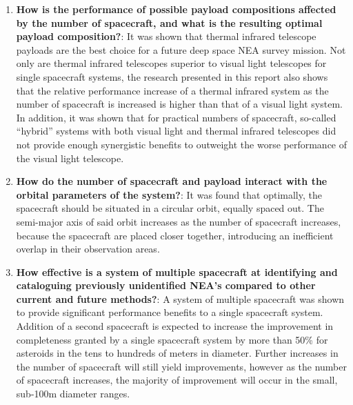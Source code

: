\begin{enumerate}
 \item \textbf{How is the performance of possible payload compositions affected by the number of spacecraft, and what is the resulting optimal payload composition?}: It was shown that thermal infrared telescope payloads are the best choice for a future deep space NEA survey mission. Not only are thermal infrared telescopes superior to visual light telescopes for single spacecraft systems, the research presented in this report also shows that the relative performance increase of a thermal infrared system as the number of spacecraft is increased is higher than that of a visual light system. In addition, it was shown that for practical numbers of spacecraft, so-called ``hybrid'' systems with both visual light and thermal infrared telescopes did not provide enough synergistic benefits to outweight the worse performance of the visual light telescope.
 \item \textbf{How do the number of spacecraft and payload interact with the orbital parameters of the system?}: It was found that optimally, the spacecraft should be situated in a circular orbit, equally spaced out. The semi-major axis of said orbit increases as the number of spacecraft increases, because the spacecraft are placed closer together, introducing an inefficient overlap in their observation areas.
 \item \textbf{How effective is a system of multiple spacecraft at identifying and cataloguing previously unidentified NEA's compared to other current and future methods?}: A system of multiple spacecraft was shown to provide significant performance benefits to a single spacecraft system. Addition of a second spacecraft is expected to increase the improvement in completeness granted by a single spacecraft system by more than 50\% for asteroids in the tens to hundreds of meters in diameter. Further increases in the number of spacecraft will still yield improvements, however as the number of spacecraft increases, the majority of improvement will occur in the small, sub-100m diameter ranges.
\end{enumerate}


